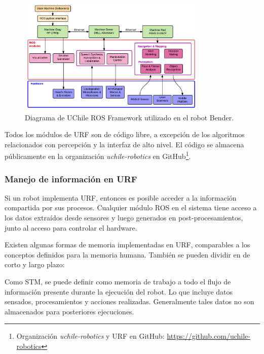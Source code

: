 \begin{figure}[H]
\centering
\includegraphics[width=0.8\textwidth]{./figures/URF.png}
\caption{\small Diagrama de UChile ROS Framework utilizado en el robot Bender.}
\label{img:URF}
\end{figure}

Todos los módulos de URF son de código libre, a excepción de los algoritmos relacionados con percepción y la interfaz de alto nivel. El código se almacena públicamente en la organización \textit{uchile-robotics} en GitHub\footnote{Organización \textit{uchile-robotics} y URF en GitHub: \url{https://github.com/uchile-robotics}}.




\subsubsection{Manejo de información en URF}

Si un robot implementa URF, entonces es posible acceder a la información compartida por sus procesos. Cualquier módulo ROS en el sistema tiene acceso a los datos extraídos desde sensores y luego generados en post-procesamientos, junto al acceso para controlar el hardware.

Existen algunas formas de memoria implementadas en URF, comparables a los conceptos definidos para la memoria humana. También se pueden dividir en de corto y largo plazo:

Como STM, se puede definir como memoria de trabajo a todo el flujo de información presente durante la ejecución del robot. Lo que incluye datos sensados, procesamientos y acciones realizadas. Generalmente tales datos no son almacenados para posteriores ejecuciones.

